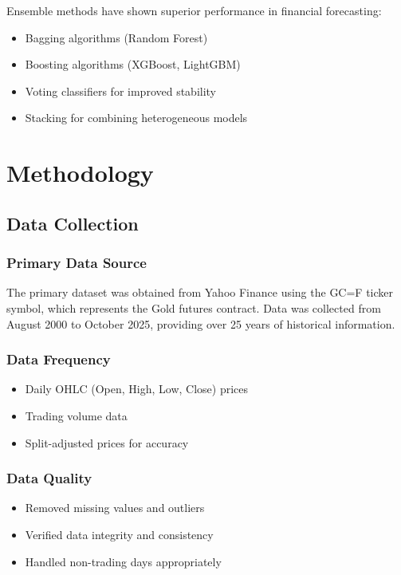 \documentclass[12pt,a4paper]{article}
\begin{document}
Ensemble methods have shown superior performance in financial forecasting:
\begin{itemize}
    \item Bagging algorithms (Random Forest)
    \item Boosting algorithms (XGBoost, LightGBM)
    \item Voting classifiers for improved stability
    \item Stacking for combining heterogeneous models
\end{itemize}

\section{Methodology}

\subsection{Data Collection}

\subsubsection{Primary Data Source}
The primary dataset was obtained from Yahoo Finance using the GC=F ticker symbol, which represents the Gold futures contract. Data was collected from August 2000 to October 2025, providing over 25 years of historical information.

\subsubsection{Data Frequency}
\begin{itemize}
    \item Daily OHLC (Open, High, Low, Close) prices
    \item Trading volume data
    \item Split-adjusted prices for accuracy
\end{itemize}

\subsubsection{Data Quality}
\begin{itemize}
    \item Removed missing values and outliers
    \item Verified data integrity and consistency
    \item Handled non-trading days appropriately
\end{itemize}
\end{document}

